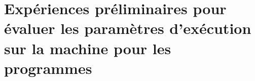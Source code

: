 
\chapter{Expériences préliminaires pour évaluer les paramètres
d'exécution sur la machine  pour les programmes
}
\label{ExperiencesPreliminairesWordCount.ann}

\begin{landscape}

\end{landscape}



